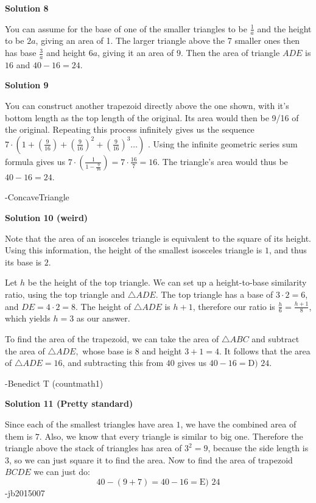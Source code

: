\begin{enumerate}
 



\textbf{Solution 8}

You can assume for the base of one of the smaller triangles to be $\frac{1}{a}$ and the height to be $2a$, giving an area of 1. The larger triangle above the 7 smaller ones then has base $\frac{3}{a}$ and height $6a$, giving it an area of $9$. Then the area of triangle $ADE$ is $16$ and $40-16=\boxed{24}$.

 



\textbf{Solution 9}

You can construct another trapezoid directly above the one shown, with it's bottom length as the top length of the original. Its area would then be 9/16 of the original. Repeating this process infinitely gives us the sequence $7\cdot\left(1+\left(\frac{9}{16}\right)+\left(\frac{9}{16}\right)^2+\left(\frac{9}{16}\right)^3\dots\right)$ . Using the infinite geometric series sum formula gives us $7\cdot\left(\frac{1}{1-\frac{9}{16}}\right)=7\cdot\frac{16}{7}=16$. The triangle's area would thus be $40-16=\boxed{24}$.  

 -ConcaveTriangle

 



\textbf{Solution 10 (weird)}

Note that the area of an isosceles triangle is equivalent to the square of its height. Using this information, the height of the smallest isosceles triangle is $1$, and thus its base is $2.$ 

 Let $h$ be the height of the top triangle. We can set up a height-to-base similarity ratio, using the top triangle and $\triangle{ADE}$. The top triangle has a base of $3\cdot{2}=6$, and $DE=4\cdot{2}=8.$ The height of $\triangle{ADE}$ is $h+1$, therefore our ratio is $\frac{h}{6}=\frac{h+1}{8}$, which yields $h=3$ as our answer. 

 To find the area of the trapezoid, we can take the area of $\triangle{ABC}$ and subtract the area of $\triangle{ADE},$ whose base is $8$ and height $3+1=4$. It follows that the area of $\triangle{ADE}=16$, and subtracting this from $40$ gives us $40-16=\boxed{\text{D) }24}$.

 -Benedict T (countmath1)

 



\textbf{Solution 11 (Pretty standard)}

Since each of the smallest triangles have area $1$, we have the combined area of them is $7$. Also, we know that every triangle is similar to big one. Therefore the triangle above the stack of triangles has area of $3^2 = 9$, because the side length is $3$, so we can just square it to find the area. Now to find the area of trapezoid $BCDE$ we can just do: 
 \[40-(9+7) = 40-16=\boxed{\text{E) }24}\]-jb2015007


\end{enumerate}
